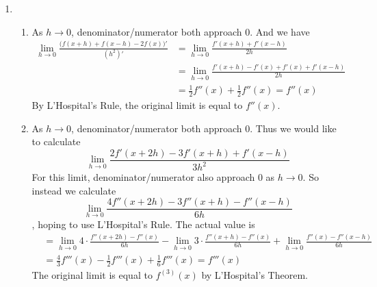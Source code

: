 \documentclass[11pt]{report}
\newcommand{\ra}{\rightarrow}
\begin{document}
\begin{enumerate}
\item
\begin{enumerate}
	\item As $h\ra 0$, denominator/numerator both approach 0. And we have
	$$\begin{aligned}
		\lim_{h\ra0} \frac{\big(f(x+h)+f(x-h)-2f(x)\big)'}{(h^2)'} &= \lim_{h\ra0} \frac{f'(x+h)+f'(x-h)}{2h}
		\\&= \lim_{h\ra0} \frac{f'(x+h)-f'(x) + f'(x)+f'(x-h)}{2h} \\
		&= \frac{1}{2}f''(x) + \frac{1}{2}f''(x) = f''(x)
	\end{aligned}$$
	By L'Hospital's Rule, the original limit is equal to $f''(x)$.

	\item As $h\ra 0$, denominator/numerator both approach 0. Thus we would like to calculate
	$$\lim_{h\ra0}\frac{2f'(x+2h)-3f'(x+h)+f'(x-h)}{3h^2} $$
	For this limit, denominator/numerator also approach 0 as $h\ra 0$. So instead we calculate
	$$\lim_{h\ra0} \frac{4f''(x+2h) -3f''(x+h)-f''(x-h)}{6h}$$
	, hoping to use L'Hospital's Rule. The actual value is
	$$\begin{aligned}
	&=\lim_{h\ra0} 4\cdot \frac{f''(x+2h)-f''(x)}{6h} - \lim_{h\ra0} 3\cdot \frac{f''(x+h)-f''(x)}{6h}  + \lim_{h\ra0} \frac{f''(x)-f''(x-h)}{6h} \\
	&= \frac{4}{3}f'''(x) - \frac{1}{2}f'''(x) + \frac{1}{6}f'''(x) = f'''(x)
	\end{aligned}$$
	The original limit is equal to $f^{(3)}(x)$ by L'Hospital's Theorem.
\end{enumerate}

\end{enumerate}
\end{document}
